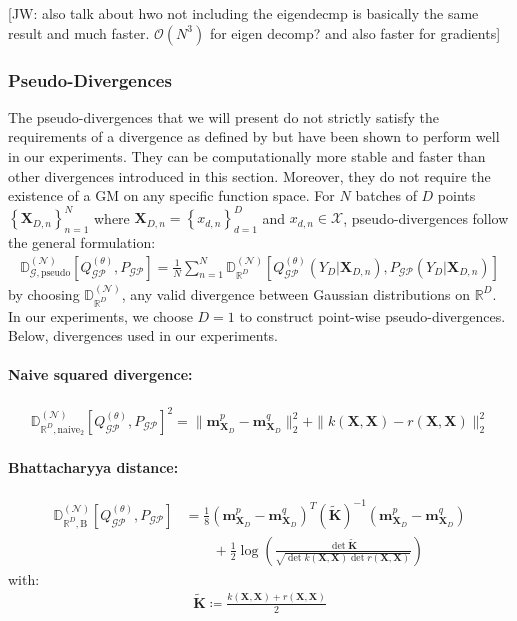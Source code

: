 \documentclass{article}
\newcommand{\jw}[1]{{\color{gray} [JW: #1]}}
\newcommand{\GP}{\operatorname{\mathcal{GP}}}
\numberwithin{equation}{section}
\begin{document}
\jw{also talk about hwo not including the eigendecmp is basically the same result and much faster. $\mathcal{O}(N^3)$ for eigen decomp? and also faster for gradients}

\subsubsection{Pseudo-Divergences}
The pseudo-divergences that we will present do not strictly satisfy the requirements of a divergence as defined by \cite{knoblauch2022optimization} but have been shown to perform well in our experiments. They can be computationally more stable and faster than other divergences introduced in this section. Moreover, they do not require the existence of a GM on any specific function space. For $N$ batches of $D$ points $\left\{\mathbf{X}_{D, n}\right\}_{n=1}^N$ where $\mathbf{X}_{D, n}=\left\{x_{d, n}\right\}_{d=1}^D$ and $x_{d, n} \in \mathcal{X}$, pseudo-divergences follow the general formulation:
\begin{align}
    \mathbb{D}_{\mathcal{G}, \text{pseudo}}^{(\mathcal{N})} \left[Q_{\GP}^{(\theta)}, P_{\GP}\right] = \frac{1}{N}\sum_{n=1}^N \mathbb{D}_{\mathbb{R}^D}^{(\mathcal{N})}\left[Q_{\GP}^{(\theta)}(Y_D\vert \mathbf{X}_{D, n}), P_{\GP}(Y_D\vert \mathbf{X}_{D, n})\right]
\end{align}
by choosing $\mathbb{D}_{\mathbb{R}^D}^{(\mathcal{N})}$,  any valid divergence between Gaussian distributions on $\mathbb{R}^D$. In our experiments, we choose $D=1$ to construct point-wise pseudo-divergences. Below, divergences used in our experiments.
\paragraph{Naive squared divergence:}
\begin{align}
    \mathbb{D}_{\mathbb{R}^D, \text{naive}_2}^{(\mathcal{N})} \left[Q_{\GP}^{(\theta)}, P_{\GP}\right]^2 = \|\mathbf{m}_{\mathbf{X}_D}^p - \mathbf{m}_{\mathbf{X}_D}^q\|_2^2 + \|k(\mathbf{X}, \mathbf{X}) - r(\mathbf{X}, \mathbf{X})\|_2^2
\end{align}

\paragraph{Bhattacharyya distance:}
\begin{align}
    \mathbb{D}_{\mathbb{R}^D, \text{B}}^{(\mathcal{N})} \left[Q_{\GP}^{(\theta)}, P_{\GP}\right] &= \frac{1}{8}\left(\mathbf{m}_{\mathbf{X}_D}^p - \mathbf{m}_{\mathbf{X}_D}^q\right)^T \left(\tilde{\textbf{K}}\right)^{-1}\left(\mathbf{m}_{\mathbf{X}_D}^p - \mathbf{m}_{\mathbf{X}_D}^q\right) \nonumber
    \\ &\qquad + \frac{1}{2} \log\left(\frac{\det\tilde{\textbf{K}}}{\sqrt{\det k(\mathbf{X}, \mathbf{X})\det r(\mathbf{X}, \mathbf{X})}}\right)
\end{align}
with:
\begin{align}
    \tilde{\textbf{K}} \coloneqq \frac{ k(\mathbf{X}, \mathbf{X}) +  r(\mathbf{X}, \mathbf{X})}{2}
\end{align}
\end{document}
